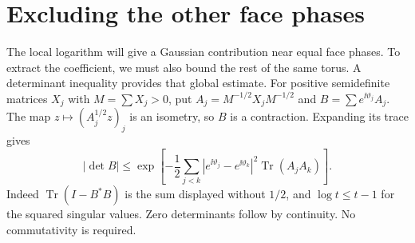 \section{Excluding the other face phases}\label{sa:angles}
The local logarithm will give a Gaussian contribution near equal face
phases. To extract the coefficient, we must also bound the rest of the
same torus. A determinant inequality provides that global estimate.
For positive semidefinite matrices $X_j$ with $M=\sum X_j>0$, put
$A_j=M^{-1/2}X_jM^{-1/2}$ and $B=\sum e^{\ii\vartheta_j}A_j$.
The map $z\mapsto(A_j^{1/2}z)_j$ is an isometry, so $B$ is a
contraction. Expanding its trace gives
\begin{equation}\label{sa:det-gap}
 |\det B|\le
 \exp\left[-\frac12\sum_{j<k}|e^{\ii\vartheta_j}-e^{\ii\vartheta_k}|^2
                                      \operatorname{Tr}(A_jA_k)\right].
\end{equation}
Indeed $\operatorname{Tr}(I-B^*B)$ is the sum displayed without
$1/2$, and $\log t\le t-1$ for the squared singular values. Zero
determinants follow by continuity. No commutativity is required.

